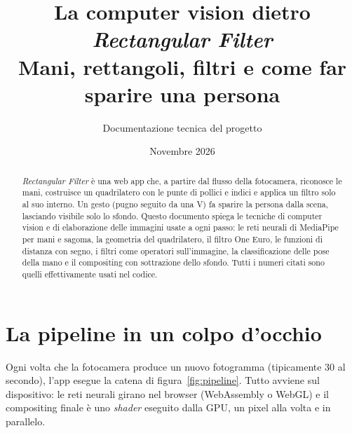 \documentclass[11pt,a4paper]{article}
\title{La computer vision dietro \emph{Rectangular Filter}\\[4pt]
\large Mani, rettangoli, filtri e come far sparire una persona}
\author{Documentazione tecnica del progetto}
\date{Novembre 2026}
\begin{document}
\maketitle

\begin{abstract}
\noindent \emph{Rectangular Filter} è una web app che, a partire dal flusso della fotocamera,
riconosce le mani, costruisce un quadrilatero con le punte di pollici e indici e applica un
filtro solo al suo interno. Un gesto (pugno seguito da una V) fa sparire la persona dalla scena,
lasciando visibile solo lo sfondo. Questo documento spiega le tecniche di computer vision
e di elaborazione delle immagini usate a ogni passo: le reti neurali di MediaPipe per mani e
sagoma, la geometria del quadrilatero, il filtro One Euro, le funzioni di distanza con segno, i
filtri come operatori sull'immagine, la classificazione delle pose della mano e il compositing
con sottrazione dello sfondo. Tutti i numeri citati sono quelli effettivamente usati nel codice.
\end{abstract}

\setcounter{tocdepth}{2}
{\small\tableofcontents}
\clearpage

\section{La pipeline in un colpo d'occhio}

Ogni volta che la fotocamera produce un nuovo fotogramma (tipicamente 30 al secondo), l'app
esegue la catena di figura~\ref{fig:pipeline}. Tutto avviene sul dispositivo: le reti neurali
girano nel browser (WebAssembly o WebGL) e il compositing finale è uno \emph{shader} eseguito
dalla GPU, un pixel alla volta e in parallelo.
\end{document}
